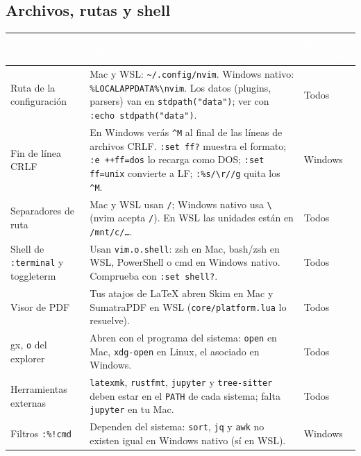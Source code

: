 \documentclass[8pt,a4paper,landscape]{extarticle}
\newcommand{\kk}[1]{\texttt{#1}}
\newcommand{\bs}{\textbackslash{}}
\newcommand{\tl}{\textasciitilde{}}
\newcommand{\ca}{\textasciicircum{}}
\newenvironment{cht}{%
  \begin{longtable}{>{\raggedright\arraybackslash\ttfamily}p{0.27\textwidth}
                    >{\raggedright\arraybackslash}p{0.46\textwidth}
                    >{\raggedright\arraybackslash}p{0.21\textwidth}}
  \rowcolor{accent}\textcolor{white}{\textbf{\rmfamily Comando / atajo}} &
  \textcolor{white}{\textbf{Qué hace}} & \textcolor{white}{\textbf{Dónde funciona}} \\
  \endhead
}{\end{longtable}}
\newcommand{\rr}[3]{#1 & #2 & #3 \\}
\newcommand{\rg}[3]{\rowcolor{rowgray}\relax #1 & #2 & #3 \\}
\let\oldsubsection\subsection
\renewcommand{\subsection}{\Needspace{9\baselineskip}\oldsubsection}
\begin{document}
\subsection{Archivos, rutas y shell}
\begin{cht}
\rg{Ruta de la configuración}{Mac y WSL: \kk{\tl/.config/nvim}. Windows nativo: \kk{\%LOCALAPPDATA\%\bs nvim}. Los datos (plugins, parsers) van en \kk{stdpath("data")}; ver con \kk{:echo stdpath("data")}.}{Todos}
\rr{Fin de línea CRLF}{En Windows verás \kk{\ca{}M} al final de las líneas de archivos CRLF. \kk{:set ff?} muestra el formato; \kk{:e ++ff=dos} lo recarga como DOS; \kk{:set ff=unix} convierte a LF; \kk{:\%s/\bs r//g} quita los \kk{\ca{}M}.}{Windows}
\rg{Separadores de ruta}{Mac y WSL usan \kk{/}; Windows nativo usa \kk{\bs} (nvim acepta \kk{/}). En WSL las unidades están en \kk{/mnt/c/\ldots}.}{Todos}
\rr{Shell de \kk{:terminal} y toggleterm}{Usan \kk{vim.o.shell}: zsh en Mac, bash/zsh en WSL, PowerShell o cmd en Windows nativo. Comprueba con \kk{:set shell?}.}{Todos}
\rg{Visor de PDF}{Tus atajos de LaTeX abren Skim en Mac y SumatraPDF en WSL (\kk{core/platform.lua} lo resuelve).}{Todos}
\rg{gx, \kk{o} del explorer}{Abren con el programa del sistema: \kk{open} en Mac, \kk{xdg-open} en Linux, el asociado en Windows.}{Todos}
\rg{Herramientas externas}{\kk{latexmk}, \kk{rustfmt}, \kk{jupyter} y \kk{tree-sitter} deben estar en el \kk{PATH} de cada sistema; falta \kk{jupyter} en tu Mac.}{Todos}
\rr{Filtros \kk{:\%!cmd}}{Dependen del sistema: \kk{sort}, \kk{jq} y \kk{awk} no existen igual en Windows nativo (sí en WSL).}{Windows}
\end{cht}
\end{document}

